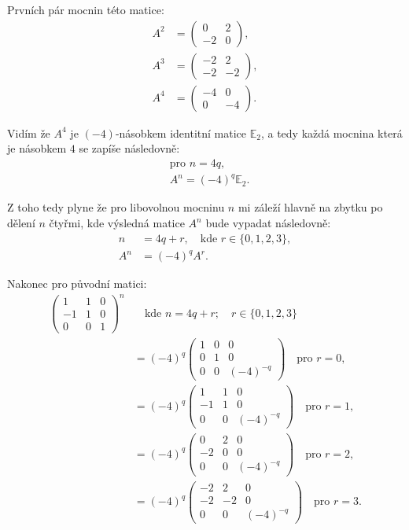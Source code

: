 \documentclass[11pt,a4paper]{article}
\begin{document}
Prvních pár mocnin této matice:
\begin{align*}
  A^2 &= \begin{pmatrix}
    0 & 2 \\
    -2 & 0
  \end{pmatrix}, \\
  A^3 &= \begin{pmatrix}
    -2 & 2 \\
    -2 & -2
  \end{pmatrix}, \\
  A^4 &= \begin{pmatrix}
    -4 & 0 \\
    0 & -4
  \end{pmatrix}.
\end{align*}

Vidím že $A^4$ je $(-4)$-násobkem identitní matice $\mathbb{E}_2$, a tedy každá mocnina která je násobkem $4$ se zapíše následovně:
\begin{align*}
  &\text{pro } n = 4q, \\
  &A^n = (-4)^q \mathbb{E}_2.
\end{align*}

Z toho tedy plyne že pro libovolnou mocninu $n$ mi záleží hlavně na zbytku po dělení $n$ čtyřmi, kde výsledná matice $A^n$ bude vypadat následovně:
\begin{align*}
  n &= 4q + r, \quad\text{kde } r \in \{0,1,2,3\}, \\
  A^n &= (-4)^q A^r.
\end{align*}

Nakonec pro původní matici:
\begin{align*}
  \begin{pmatrix}
    1 & 1 & 0 \\
    -1 & 1 & 0 \\
    0 & 0 & 1
  \end{pmatrix}^n
  &\quad\text{kde } n = 4q + r; \quad r \in \{0,1,2,3\} \\
  &= (-4)^q \begin{pmatrix}
    1 & 0 & 0 \\
    0 & 1 & 0 \\
    0 & 0 & (-4)^{-q}
  \end{pmatrix} \quad\text{pro } r = 0, \\[1ex]
  &= (-4)^q \begin{pmatrix}
    1 & 1 & 0 \\
    -1 & 1 & 0 \\
    0 & 0 & (-4)^{-q}
  \end{pmatrix} \quad\text{pro } r = 1, \\[1ex]
  &= (-4)^q \begin{pmatrix}
    0 & 2 & 0 \\
    -2 & 0 & 0 \\
    0 & 0 & (-4)^{-q}
  \end{pmatrix} \quad\text{pro } r = 2, \\[1ex]
  &= (-4)^q \begin{pmatrix}
    -2 & 2 & 0 \\
    -2 & -2 & 0 \\
    0 & 0 & (-4)^{-q}
  \end{pmatrix} \quad\text{pro } r = 3.
\end{align*}
\end{document}
